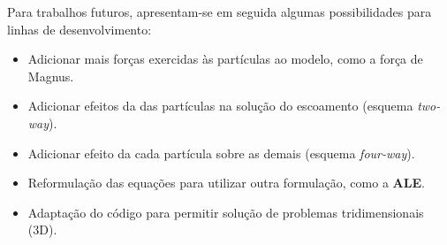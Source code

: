 Para trabalhos futuros, apresentam-se em seguida algumas possibilidades para linhas de desenvolvimento:
\begin{itemize}
	\item Adicionar mais forças exercidas às partículas ao modelo, como a força de Magnus.
	\item Adicionar efeitos da das partículas na solução do escoamento (esquema \textit{two-way}).
	\item Adicionar efeito da cada partícula sobre as demais (esquema \textit{four-way}).
	\item Reformulação das equações para utilizar outra formulação, como a \textbf{ALE}.
	\item Adaptação do código para permitir solução de problemas tridimensionais (3D).
\end{itemize}
